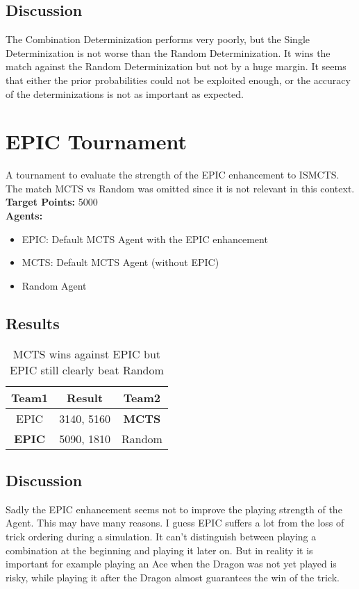 \subsection*{Discussion}
The Combination Determinization performs very poorly, but the Single Determinization is not worse than the Random Determinization. It wins the match against the Random Determinization but not by a huge margin. It seems that either the prior probabilities could not be exploited enough, or the accuracy of the determinizations is not as important as expected.

\section{EPIC Tournament}
A tournament to evaluate the strength of the EPIC enhancement to ISMCTS.
The match MCTS vs Random was omitted since it is not relevant in this context.
\textbf{Target Points:} 5000\\
\textbf{Agents:}
\begin{itemize}
    \setlength\itemsep{2px}
    \item EPIC: Default MCTS Agent with the EPIC enhancement
    \item MCTS: Default MCTS Agent (without EPIC)
    \item Random Agent
\end{itemize}

\subsection*{Results}
\begin{table}[H]
  \centering
  \begin{tabular}{ccc}
    \textbf{Team1} & \textbf{Result}  & \textbf{Team2}\\
    \hline
    EPIC & 3140, 5160 & \textbf{MCTS}\\
    \hline
    \textbf{EPIC} & 5090, 1810 & Random \\
    \hline
  \end{tabular}
  \caption[Result of the EPIC Tournament]{MCTS wins against EPIC but EPIC still clearly beat Random}
\end{table}

\subsection*{Discussion}
Sadly the EPIC enhancement seems not to improve the playing strength of the Agent.
This may have many reasons. I guess EPIC suffers a lot from the loss of trick ordering during a simulation. It can't distinguish between playing a combination at the beginning and playing it later on. But in reality it is important for example playing an Ace when the Dragon was not yet played is risky, while playing it after the Dragon almost guarantees the win of the trick.

